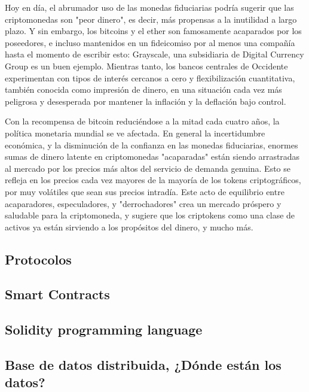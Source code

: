 Hoy en día, el abrumador uso de las monedas fiduciarias podría sugerir que
las criptomonedas son "peor dinero", es decir, más propensas a la inutilidad a largo plazo.
Y sin embargo, los bitcoins y el ether son famosamente acaparados por los poseedores, e incluso
mantenidos en un fideicomiso por al menos una compañía hasta el momento de escribir esto:
Grayscale, una subsidiaria de Digital Currency Group es un buen ejemplo.
Mientras tanto, los bancos centrales de Occidente experimentan con tipos de interés cercanos a cero
y flexibilización cuantitativa, también conocida como impresión de dinero, en una situación cada
vez más peligrosa y desesperada por mantener la inflación y la deflación bajo control.

Con la recompensa de bitcoin reduciéndose a la mitad cada cuatro años, la política monetaria
mundial se ve afectada. En general la incertidumbre económica, y la disminución de la confianza en
las monedas fiduciarias, enormes sumas de dinero latente en criptomonedas "acaparadas" están siendo
arrastradas al mercado por los precios más altos del servicio de demanda genuina. Esto se refleja
en los precios cada vez mayores de la mayoría de los tokens criptográficos, por muy volátiles que
sean sus precios intradía. Este acto de equilibrio entre acaparadores, especuladores, y
"derrochadores" crea un mercado próspero y saludable para la criptomoneda, y sugiere que
los criptokens como una clase de activos ya están sirviendo a los propósitos del dinero, y mucho
más.


\subsection{Protocolos}

\subsection{Smart Contracts}

\subsection{Solidity programming language}

\subsection{Base de datos distribuida, ¿Dónde están los datos?}
